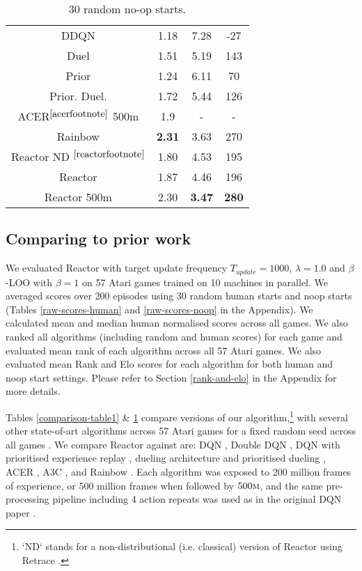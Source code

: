 \documentclass{article}
\begin{document}
\begin{table}[ht]
\begin{minipage}{.35\textwidth}
\begin{center}
\begin{small}
\begin{sc}
\begin{tabular}{| c | c | c | c |}
DDQN & 1.18 & 7.28 & -27\\
Duel & 1.51 & 5.19 & 143\\
Prior & 1.24 & 6.11 & 70\\
Prior. Duel. & 1.72 & 5.44 & 126\\
ACER$^{\ref{acerfootnote}}$ 500m & 1.9 & - & - \\
Rainbow & {\bf 2.31} & 3.63 & 270\\
Reactor ND $^{\ref{reactorfootnote}}$ & 1.80 & 4.53 & 195\\
Reactor & 1.87 & 4.46 & 196\\
Reactor 500m & 2.30 & {\bf 3.47} & {\bf 280}\\
\hline
\end{tabular}
\clearpage{}
\end{sc}
\hfill
\end{small}
\end{center}
\vspace{-0.2in}
\caption{\small 30 random no-op starts.}
\label{comparison-table3}
\end{minipage}
\end{table}
\subsection{Comparing to prior work}
We evaluated Reactor with target update frequency $T_{update}=1000$, 
$\lambda=1.0$ and $\beta$-LOO with $\beta=1$ on 
57 Atari games trained on 10 machines in parallel. 
We averaged scores over 200 episodes using 30 random human starts 
and noop starts (Tables \ref{raw-scores-human} and 
\ref{raw-scores-noop} in the Appendix). We calculated mean and 
median human normalised scores across all games. We also ranked 
all algorithms (including random and human scores) for each game and evaluated 
mean rank of each algorithm across all 57 Atari games. We also evaluated mean
Rank and Elo scores for each algorithm for both human and noop start settings. Please refer to Section 
\ref{rank-and-elo} in the Appendix for more details.

Tables \ref{comparison-table1} \& \ref{comparison-table3} compare versions of our algorithm,\footnote{
  \label{reactorfootnote}
  `ND` stands for a non-distributional (i.e. classical) version of Reactor 
  using Retrace \citep{munos2016safe}.
} with several other state-of-art algorithms across 57 Atari games for a 
fixed random seed across all games \citep{bellemare2013arcade}. 
We compare Reactor against are: DQN \citep{mnih15human}, Double 
DQN \citep{van2016deep}, DQN with prioritised experience replay 
\citep{schaul2015prioritized}, dueling architecture and prioritised dueling 
\citep{wang2015dueling}, ACER \citep{wang2017sample}, A3C \citep{mnih2016asynchronous}, and Rainbow \citep{rainbow}. 
Each algorithm was exposed to 200 million 
frames of experience, or 500 million frames when followed by $500\textsc{m}$, and the same pre-processing 
pipeline including 4 action repeats was used as in the original DQN paper \citep{mnih15human}. 
\end{document}

